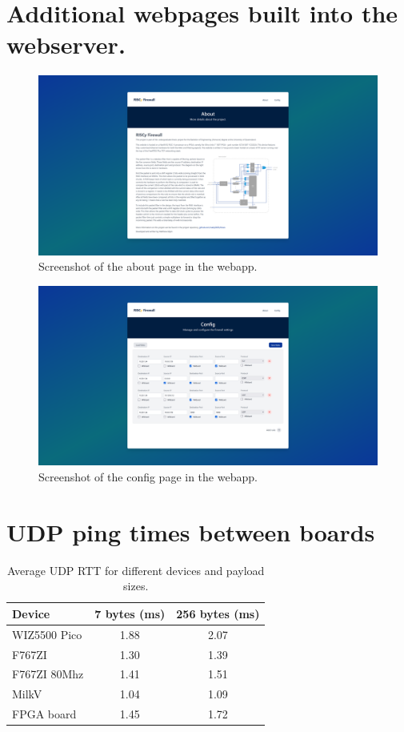 \section{Additional webpages built into the webserver.}
\label{app:additional_webpages}
\begin{figure}[h!]
    \centering
    \includegraphics[width=1\textwidth]{Images/webapp_about.png}
    \caption{Screenshot of the about page in the webapp.}
    \label{fig:web_app_about}
\end{figure}

\begin{figure}[h!]
    \centering
    \includegraphics[width=1\textwidth]{Images/webapp_config.png}
    \caption{Screenshot of the config page in the webapp.}
    \label{fig:web_app_config}
\end{figure}


\section{UDP ping times between boards}
\label{app:udp_ping_measurements}
\begin{table}[ht]
    \centering
    \caption{Average UDP RTT for different devices and payload sizes.}
    \begin{tabular}{lcc}
    \toprule
    Device & 7 bytes (ms) & 256 bytes (ms) \\
    \midrule
    WIZ5500 Pico & 1.88 & 2.07 \\
    F767ZI & 1.30 & 1.39 \\
    F767ZI 80Mhz & 1.41 & 1.51 \\
    MilkV & 1.04 & 1.09 \\
    FPGA board & 1.45 & 1.72 \\
    \bottomrule
    \end{tabular}
    \end{table}


